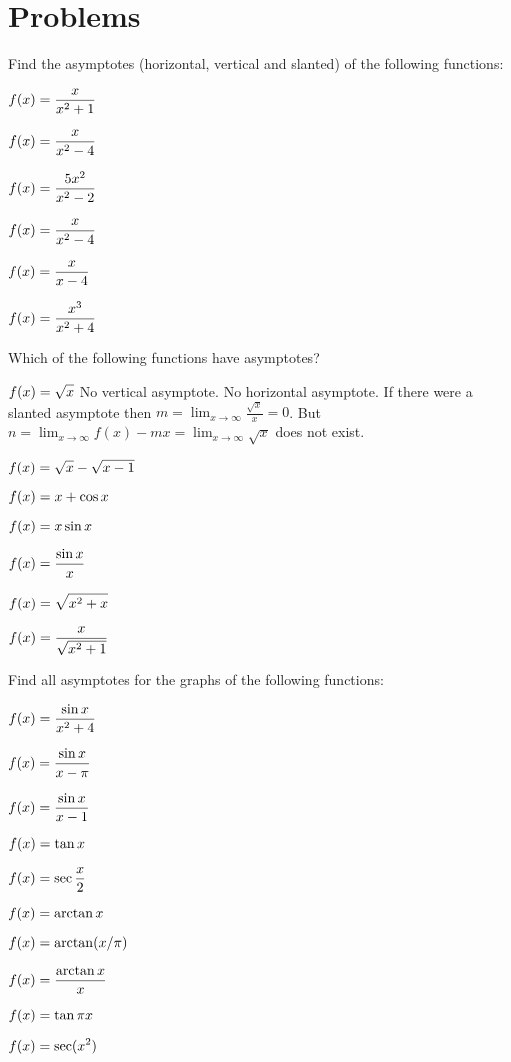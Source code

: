 \section{Problems} 
\problemfont 
\begin{multicols}{2}
\problem Find the asymptotes (horizontal, vertical and slanted) of the 
following functions:

\subprob $\displaystyle f(x) = \frac{x}{x^2+1}$

\subprob $\displaystyle f(x) = \frac{x}{x^2-4}$

\subprob $\displaystyle f(x) = \frac{5x^2}{x^2-2}$

\subprob $\displaystyle f(x) = \frac{x}{x^2-4}$

\subprob $\displaystyle f(x) = \frac{x}{x-4}$

\subprob $\displaystyle f(x) = \frac{x^3}{x^2+4}$

\problem Which of the following functions have asymptotes? 

\subprob \(\displaystyle f(x) = \sqrt{x} \)
\answer 
No vertical asymptote.  
No horizontal asymptote.  
If there were a slanted asymptote then $m =
\lim_{x\to\infty}\frac{\sqrt{x}}{x} = 0$. But $n = \lim_{x\to\infty}
f(x) - mx = \lim_{x\to\infty}\sqrt{x}$ does not exist.
\endanswer

\subprob \(\displaystyle f(x) = \sqrt{x} - \sqrt{x-1}\)

\subprob \(\displaystyle f(x) = x+ \cos x \)

\subprob \(\displaystyle f(x) = x\sin x \)

\subprob \(\displaystyle f(x) = \dfrac{\sin x}{x} \)

\subprob $\displaystyle f(x) = \sqrt{x^2+x}$

\subprob $\displaystyle f(x) = \frac{x}{\sqrt{x^2+1}}$

\problem Find all asymptotes for the graphs of the following functions: 

\subprob $\displaystyle f(x) = \frac{\sin x}{x^2+4}$

\subprob $\displaystyle f(x) = \frac{\sin x}{x-\pi}$

\subprob $\displaystyle f(x) = \frac{\sin x}{x-1}$

\subprob $\displaystyle f(x) = \tan x$

\subprob $\displaystyle f(x) = \sec \frac x2$

\subprob $\displaystyle f(x) = \arctan x$

\subprob $\displaystyle f(x) = \arctan (x/\pi)$

\subprob $\displaystyle f(x) = \dfrac{\arctan x}{x}$

\subprob $\displaystyle f(x) = \tan \pi x$

\subprob $\displaystyle f(x) = \sec (x^2)$


\end{multicols}
